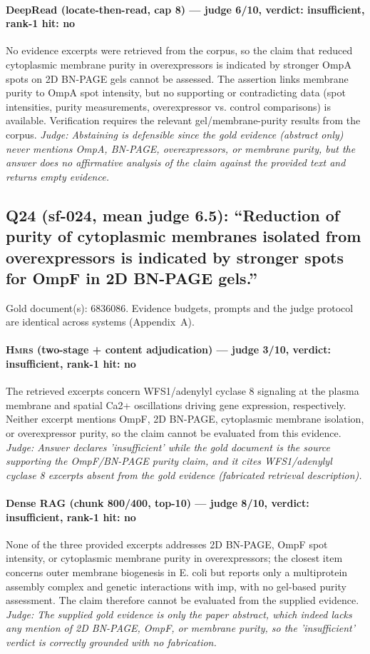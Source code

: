 \documentclass[sigconf, review, anonymous]{acmart}
\begin{document}
\paragraph{DeepRead (locate-then-read, cap 8) --- judge 6/10, verdict: insufficient, rank-1 hit: no}
\noindent No evidence excerpts were retrieved from the corpus, so the claim that reduced cytoplasmic membrane purity in overexpressors is indicated by stronger OmpA spots on 2D BN-PAGE gels cannot be assessed. The assertion links membrane purity to OmpA spot intensity, but no supporting or contradicting data (spot intensities, purity measurements, overexpressor vs. control comparisons) is available. Verification requires the relevant gel/membrane-purity results from the corpus.
\noindent\small\textit{Judge: Abstaining is defensible since the gold evidence (abstract only) never mentions OmpA, BN-PAGE, overexpressors, or membrane purity, but the answer does no affirmative analysis of the claim against the provided text and returns empty evidence.}

\subsection{Q24 (sf-024, mean judge 6.5): ``Reduction of purity of cytoplasmic membranes isolated from overexpressors is indicated by stronger spots for OmpF in 2D BN-PAGE gels.''}
\label{app:q24}
\noindent Gold document(s): 6836086. Evidence budgets, prompts and the judge protocol are identical across systems (Appendix~A).
\paragraph{\textbf{\textsc{Hmrs}} (two-stage + content adjudication) --- judge 3/10, verdict: insufficient, rank-1 hit: no}
\noindent The retrieved excerpts concern WFS1/adenylyl cyclase 8 signaling at the plasma membrane and spatial Ca2+ oscillations driving gene expression, respectively. Neither excerpt mentions OmpF, 2D BN-PAGE, cytoplasmic membrane isolation, or overexpressor purity, so the claim cannot be evaluated from this evidence.
\noindent\small\textit{Judge: Answer declares 'insufficient' while the gold document is the source supporting the OmpF/BN-PAGE purity claim, and it cites WFS1/adenylyl cyclase 8 excerpts absent from the gold evidence (fabricated retrieval description).}
\paragraph{Dense RAG (chunk 800/400, top-10) --- judge 8/10, verdict: insufficient, rank-1 hit: no}
\noindent None of the three provided excerpts addresses 2D BN-PAGE, OmpF spot intensity, or cytoplasmic membrane purity in overexpressors; the closest item concerns outer membrane biogenesis in E. coli but reports only a multiprotein assembly complex and genetic interactions with imp, with no gel-based purity assessment. The claim therefore cannot be evaluated from the supplied evidence.
\noindent\small\textit{Judge: The supplied gold evidence is only the paper abstract, which indeed lacks any mention of 2D BN-PAGE, OmpF, or membrane purity, so the 'insufficient' verdict is correctly grounded with no fabrication.}
\end{document}
